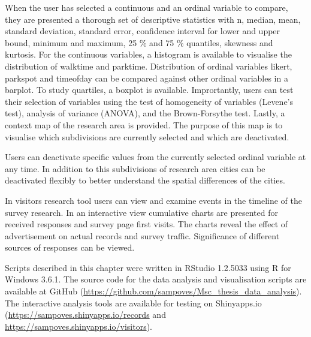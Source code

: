 When the user has selected a continuous and an ordinal variable to compare, they are presented a thorough set of descriptive statistics with n, median, mean, standard deviation, standard error, confidence interval for lower and upper bound, minimum and maximum, 25 \% and 75 \% quantiles, skewness and kurtosis. For the continuous variables, a histogram is available to visualise the distribution of walktime and parktime. Distribution of ordinal variables likert, parkspot and timeofday can be compared against other ordinal variables in a barplot. To study quartiles, a boxplot is available. Imprortantly, users can test their selection of variables using the test of homogeneity of variables (Levene's test), analysis of variance (ANOVA), and the Brown-Forsythe test. Lastly, a context map of the research area is provided. The purpose of this map is to visualise which subdivisions are currently selected and which are deactivated.

Users can deactivate specific values from the currently selected ordinal variable at any time. In addition to this subdivisions of research area cities can be deactivated flexibly to better understand the spatial differences of the cities.

In visitors research tool users can view and examine events in the timeline of the survey research. In an interactive view cumulative charts are presented for received responses and survey page first visits. The charts reveal the effect of advertisement on actual records and survey traffic. Significance of different sources of responses can be viewed.

Scripts described in this chapter were written in RStudio 1.2.5033 using R for Windows 3.6.1. The source code for the data analysis and visualisation scripts are available at GitHub (\textcolor{blue}{\url{https://github.com/sampoves/Msc_thesis_data_analysis}}). The interactive analysis tools are available for testing on Shinyapps.io (\textcolor{blue}{\url{https://sampoves.shinyapps.io/records}} and  \textcolor{blue}{\url{https://sampoves.shinyapps.io/visitors}}). 
